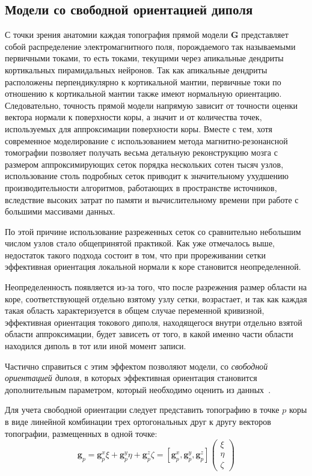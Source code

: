 \subsection{Модели со свободной ориентацией диполя}
С точки зрения анатомии каждая топография прямой модели $\mathbf{G}$
представляет собой распределение электромагнитного поля,
порождаемого так называемыми первичными токами, то есть токами,
текущими через апикальные дендриты кортикальных пирамидальных нейронов.
Так как апикальные дендриты расположены перпендикулярно к кортикальной мантии,
первичные токи по отношению к кортикальной мантии также имеют нормальную ориентацию.
Следовательно, точность прямой модели напрямую зависит от точности оценки вектора нормали
к поверхности коры, а значит и от количества точек, используемых для аппроксимации поверхности коры.
Вместе с тем, хотя современное моделирование с использованием метода магнитно-резонансной
томографии позволяет получать весьма детальную реконструкцию мозга с размером аппроксимирующих сеток
порядка нескольких сотен тысяч узлов, использование столь подробных сеток приводит к значительному
ухудшению производительности алгоритмов, работающих в пространстве источников, вследствие высоких затрат
по памяти и вычислительному времени при работе с большими массивами данных.

По этой причине использование разреженных сеток со сравнительно небольшим числом узлов стало
общепринятой практикой. Как уже отмечалось выше, недостаток такого подхода состоит в том, что
при прореживании сетки эффективная ориентация локальной нормали к коре становится неопределенной.

Неопределенность появляется из-за того, что после разрежения размер области на коре, соответствующей отдельно
взятому узлу сетки, возрастает, и так как каждая такая область характеризуется в общем случае
переменной кривизной, эффективная ориентация токового диполя,
находящегося внутри отдельно взятой области аппроксимации,
будет зависеть от того, в какой именно части области находился диполь в тот или иной момент записи.

Частично справиться с этим эффектом позволяют модели, со \emph{свободной ориентацией диполя},
в которых эффективная ориентация становится дополнительным параметром,
который необходимо оценить из данных~\cite{Lin2006}.

Для учета свободной ориентации следует представить топографию в точке $p$ коры в виде линейной
комбинации трех ортогональных друг к другу векторов топографии, размещенных в одной точке:
\begin{equation}
    \mathbf{g}_p = \mathbf{g}_p^x \xi + \mathbf{g}_p^y \eta + \mathbf{g}_p^z \zeta =
    [\mathbf{g}_p^x, \mathbf{g}_p^y, \mathbf{g}_p^z] \left(
    \begin{array}{ccc}
        \xi \\
        \eta \\
        \zeta
    \end{array}
    \right)
    \label{loose_or}
\end{equation}

